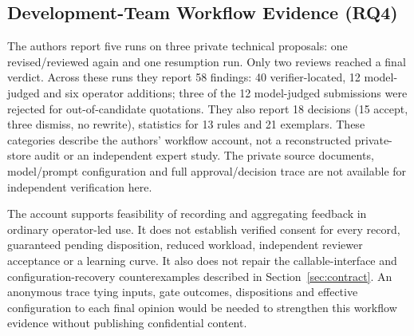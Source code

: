 \subsection{Development-Team Workflow Evidence (RQ4)}\label{sec:pilot}

The authors report five runs on three private technical proposals: one revised/reviewed again and one resumption run. Only two reviews reached a final verdict. Across these runs they report 58 findings: 40 verifier-located, 12 model-judged and six operator additions; three of the 12 model-judged submissions were rejected for out-of-candidate quotations. They also report 18 decisions (15 accept, three dismiss, no rewrite), statistics for 13 rules and 21 exemplars. These categories describe the authors' workflow account, not a reconstructed private-store audit or an independent expert study. The private source documents, model/prompt configuration and full approval/decision trace are not available for independent verification here.

The account supports feasibility of recording and aggregating feedback in ordinary operator-led use. It does not establish verified consent for every record, guaranteed pending disposition, reduced workload, independent reviewer acceptance or a learning curve. It also does not repair the callable-interface and configuration-recovery counterexamples described in Section~\ref{sec:contract}. An anonymous trace tying inputs, gate outcomes, dispositions and effective configuration to each final opinion would be needed to strengthen this workflow evidence without publishing confidential content.

